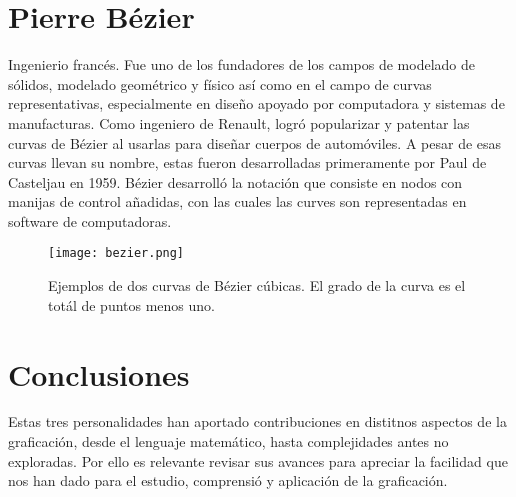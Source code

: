 \documentclass[letterpaper, 12pt]{article}
\begin{document}
\begin{justify}
        \section*{Pierre Bézier}
        Ingenierio francés. Fue uno de los fundadores de los campos de modelado de sólidos, modelado geométrico y físico así como en el campo de curvas representativas, especialmente en diseño apoyado por computadora y sistemas de manufacturas.
        Como ingeniero de Renault, logró popularizar y patentar las curvas de Bézier al usarlas para diseñar cuerpos de automóviles. A pesar de esas curvas llevan su nombre, estas fueron desarrolladas primeramente por Paul de Casteljau en 1959. Bézier
        desarrolló la notación que consiste en nodos con manijas de control añadidas, con las cuales las curves son representadas en software de computadoras.
        \begin{figure}[H]
            \centering
            \texttt{[image: bezier.png]}
            \caption{Ejemplos de dos curvas de Bézier cúbicas. El grado de la curva es el totál de puntos menos uno.}
        \end{figure}
        \section*{Conclusiones}
        Estas tres personalidades han aportado contribuciones en distitnos aspectos de la graficación, desde el lenguaje matemático, hasta complejidades antes no exploradas. Por ello es relevante revisar sus avances para apreciar la facilidad que nos han dado para
        el estudio, comprensió y aplicación de la graficación.
    \end{justify}

    \newpage
        \thispagestyle{empty}
        \printbibliography  
\end{document}
